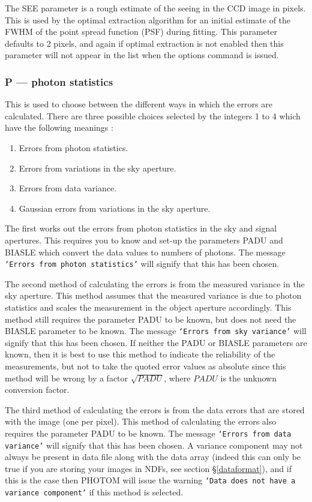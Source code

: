\documentclass[twoside,11pt]{article}
\newcommand{\hyperref}[4]{#2\ref{#4}#3}
\renewcommand{\_}{\texttt{\symbol{95}}}
\newcommand{\st}[1]{\texttt{`#1'}}
\begin{document}
The SEE parameter is a rough estimate of the seeing in the CCD image in
pixels. This is used by the optimal extraction algorithm for an initial
estimate of the FWHM of the point spread function (PSF) during fitting.
This parameter defaults to 2 pixels, and again if optimal extraction is not enabled then this parameter will not appear in the list when the options
command is issued.

\subsubsection{P --- photon statistics}

This is used to choose between the different ways in which the errors
are calculated. There are three possible choices selected by the integers
1 to 4 which have the following meanings :
\begin{enumerate}
\item Errors from photon statistics.
\item Errors from variations in the sky aperture.
\item Errors from data variance.
\item Gaussian errors from variations in the sky aperture.
\end{enumerate}
The first works out the errors from photon statistics in the sky and
signal apertures. This requires you to know and set-up the parameters
PADU and BIASLE which convert the data values to numbers of
photons. The message \st{Errors from photon statistics} will
signify that this has been chosen.

The second method of calculating the errors is from the measured
variance in the sky aperture. This method assumes that the measured
variance is due to photon statistics and scales the measurement in
the object aperture accordingly. This method still requires the
parameter PADU to be known, but does not need the BIASLE parameter to
be known. The message \st{Errors from sky variance} will signify that
this has been chosen. If neither the PADU or BIASLE parameters are
known, then it is best to use this method to indicate the reliability
of the measurements, but not to take the quoted error values as
absolute since this method will be wrong by a factor $\sqrt{PADU}$,
where $PADU$ is the unknown conversion factor.

The third method of calculating the errors is from the data errors
that are stored with the image (one per pixel). This method of
calculating the errors also requires the parameter PADU to be
known. The message \st{Errors from data variance} will signify that
this has been chosen. A variance component may not always be present
in data file along with the data array (indeed this can only be true
if you are storing your images in NDFs, see
\hyperref{here}{section \S}{}{dataformat}),
and if this is the case then PHOTOM
will issue the warning \st{Data does not have a variance component} if this
method is selected.
\end{document}
